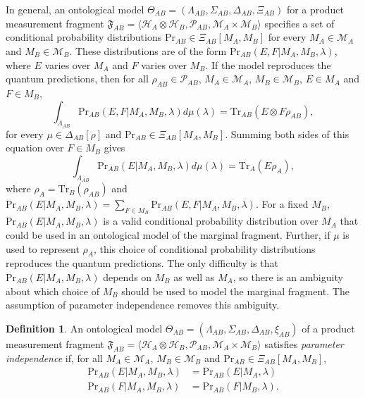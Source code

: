 \documentclass[DIV=calc,paper=a4,fontsize=11pt,twocolumn]{scrartcl} %
\theoremstyle{definition}
\newtheorem{definition}{Definition}[section]
\theoremstyle{plain}
\newcommand{\Hilb}[1][]{\ensuremath{\mathcal{H}_{#1}}}
\newcommand{\Tr}[2][]{\ensuremath{\text{Tr}_{#1} \left ( #2 \right )}}
\begin{document}
In general, an ontological model $\Theta_{AB} = (\Lambda_{AB},
\Sigma_{AB}, \Delta_{AB}, \Xi_{AB})$ for a product measurement
fragment $\mathfrak{F}_{AB} = \langle \Hilb[A] \otimes \Hilb[B],
\mathcal{P}_{AB}, \mathcal{M}_A \times \mathcal{M}_B \rangle$
specifies a set of conditional probability distributions
$\text{Pr}_{AB} \in \Xi_{AB}[M_A,\allowbreak M_B]$ for every $M_A \in
\mathcal{M}_A$ and $M_B \in \mathcal{M}_B$.  These distributions are
of the form $\text{Pr}_{AB}(E,F|M_A,M_B,\lambda)$, where $E$ varies
over $M_A$ and $F$ varies over $M_B$.  If the model reproduces the
quantum predictions, then for all $\rho_{AB} \in \mathcal{P}_{AB}$,
$M_A \in \mathcal{M}_A$, $M_B \in \mathcal{M}_B$, $E \in M_A$ and $F
\in M_B$,
\begin{equation}
\int_{\Lambda_{AB}} \text{Pr}_{AB}(E,F|M_A,M_B,\lambda)
d\mu(\lambda) = \Tr[AB]{E \otimes F \rho_{AB}},
\end{equation}
for every $\mu \in \Delta_{AB}[\rho]$ and $\text{Pr}_{AB} \in
\Xi_{AB}[M_A,M_B]$.  Summing both sides of this equation over $F \in
M_B$ gives
\begin{equation}
\label{eq:CR:margreprod}
\int_{\Lambda_{AB}} \text{Pr}_{AB}(E|M_A,M_B,\lambda) d\mu(\lambda) =
\Tr[A]{E \rho_A},
\end{equation}
where $\rho_A = \Tr[B]{\rho_{AB}}$ and
$\text{Pr}_{AB}(E|M_A,M_B,\lambda) = \sum_{F \in M_B}
\text{Pr}_{AB}(E,F|M_A,M_B,\lambda)$.  For a fixed $M_B$,
$\text{Pr}_{AB}(E|M_A,M_B,\lambda)$ is a valid conditional probability
distribution over $M_A$ that could be used in an ontological model of
the marginal fragment.  Further, if $\mu$ is used to represent
$\rho_A$, this choice of conditional probability distributions
reproduces the quantum predictions.  The only difficulty is that
$\text{Pr}_{AB}(E|M_A,M_B,\lambda)$ depends on $M_B$ as well as $M_A$,
so there is an ambiguity about which choice of $M_B$ should be used to
model the marginal fragment.  The assumption of parameter independence
removes this ambiguity.

\begin{definition}
An ontological model $\Theta_{AB} = (\Lambda_{AB}, \Sigma_{AB},
\Delta_{AB}, \xi_{AB})$ of a product measurement fragment
$\mathfrak{F}_{AB} = \langle \Hilb[A] \otimes \Hilb[B],
\mathcal{P}_{AB}, \mathcal{M}_A \times \mathcal{M}_B \rangle$
satisfies \emph{parameter independence} if, for all $M_A \in
\mathcal{M}_A$, $M_B \in \mathcal{M}_B$ and $\text{Pr}_{AB} \in
\Xi_{AB}[M_A,M_B]$,
\begin{align}
\text{Pr}_{AB}(E|M_A,M_B,\lambda) & =
\text{Pr}_{AB}(E|M_A,\lambda) \\
\text{Pr}_{AB}(F|M_A,M_B,\lambda) & =
\text{Pr}_{AB}(F|M_B,\lambda).
\end{align}
\end{definition}
\end{document}
